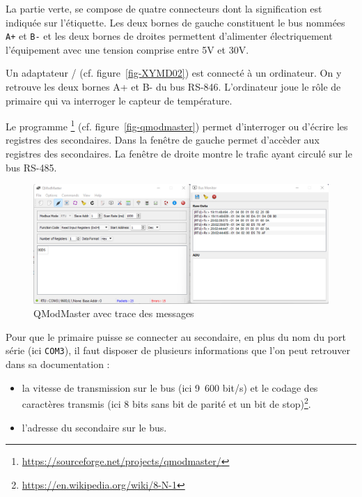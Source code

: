 La partie verte, se compose de quatre connecteurs dont la signification est indiquée sur l'étiquette. Les deux bornes de gauche constituent le bus  nommées \texttt{A+} et \texttt{B-} et les deux bornes de droites permettent d'alimenter électriquement l'équipement avec une tension comprise entre 5V et 30V.

    \vspace{1em}

 \begin{figure}
\end{figure}

Un adaptateur / (cf. figure~\vref{fig-XYMD02}) est connecté à un ordinateur. On y retrouve les deux bornes A+ et B- du bus RS-846. L'ordinateur joue le rôle de primaire qui va interroger le capteur de température.  


    \vspace{1em}

Le programme \footnote{\url{https://sourceforge.net/projects/qmodmaster/}} (cf. figure~\vref{fig-qmodmaster}) permet d'interroger ou d'écrire les registres des secondaires. Dans la fenêtre de gauche permet d'accèder aux registres des secondaires. La fenêtre de droite montre le trafic ayant circulé sur le bus RS-485.

\begin{figure}[tbp]
\centerline{\includegraphics[width=1\columnwidth]{Pictures/modbus-trace.png}}
\caption{QModMaster avec trace des messages}
\label{fig-qmodmaster}
\end{figure}

Pour que le primaire puisse se connecter au secondaire, en plus du nom du port série (ici \texttt{COM3}), il faut disposer de plusieurs informations que l'on peut retrouver dans sa documentation :

\begin{itemize}
    \item la vitesse de transmission sur le bus (ici 9~600 bit/s) et le codage des caractères transmis (ici 8 bits sans bit de parité et un bit de stop)\footnote{\url{https://en.wikipedia.org/wiki/8-N-1}}.
    \item l'adresse du secondaire sur le bus.
\end{itemize}

